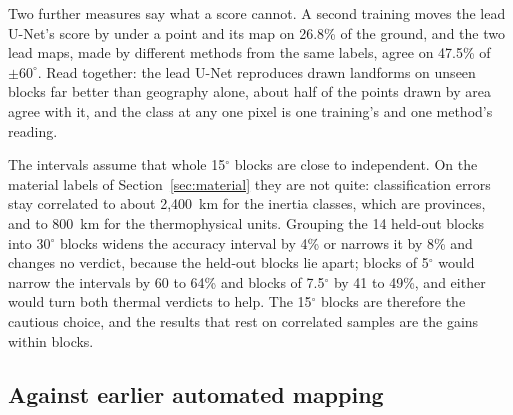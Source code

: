 \documentclass[twocolumn]{aastex701}
\newcommand{\pmsixty}{$\pm60^{\circ}$}
\begin{document}
Two further measures say what a score cannot. A second training moves the lead U-Net's score by under a point and
its map on 26.8\% of the ground, and the two lead maps, made by different methods from the same labels, agree on
47.5\% of \pmsixty. Read together: the lead U-Net reproduces drawn landforms on unseen blocks far better than
geography alone, about half of the points drawn by area agree with it, and the class at any one pixel is one
training's and one method's reading. %

The intervals assume that whole 15$^{\circ}$ blocks are close to independent. On the material labels of
Section~\ref{sec:material} they are not quite: classification errors stay correlated to about 2,400~km for the inertia
classes, which are provinces, and to 800~km for the thermophysical units. Grouping the 14 held-out blocks into
30$^{\circ}$ blocks widens the accuracy interval by 4\% or narrows it by 8\% and changes no verdict, because the
held-out blocks lie apart; blocks of 5$^{\circ}$ would narrow the intervals by 60 to 64\% and blocks of
7.5$^{\circ}$ by 41 to 49\%, and either would turn both thermal verdicts to help. The 15$^{\circ}$ blocks are therefore the cautious choice, and the results that rest on
correlated samples are the gains within blocks. %

\subsection{Against earlier automated mapping}
\end{document}
